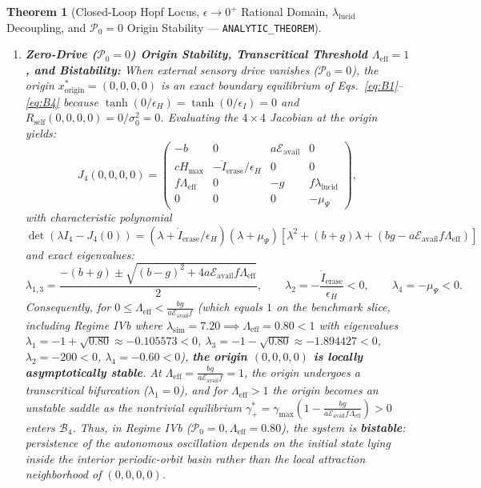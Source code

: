 \documentclass[11pt,a4paper]{article}
\newtheorem{theorem}{Theorem}
\theoremstyle{definition}
\begin{document}
\begin{theorem}[Closed-Loop Hopf Locus, $\epsilon \to 0^+$ Rational Domain, $\lambda_{\mathrm{lucid}}$ Decoupling, and $\mathcal{P}_0 = 0$ Origin Stability --- \texttt{ANALYTIC\_THEOREM}]
\begin{enumerate}
  \item \textbf{Zero-Drive ($\mathcal{P}_0 = 0$) Origin Stability, Transcritical Threshold $\Lambda_{\mathrm{eff}} = 1$, and Bistability:} When external sensory drive vanishes ($\mathcal{P}_0 = 0$), the origin $x_{\mathrm{origin}}^* = (0, 0, 0, 0)$ is an exact boundary equilibrium of Eqs.~\eqref{eq:B1}--\eqref{eq:B4} because $\tanh(0/\epsilon_H) = \tanh(0/\epsilon_I) = 0$ and $R_{\mathrm{self}}(0,0,0,0) = 0/\sigma_0^2 = 0$. Evaluating the $4\times 4$ Jacobian at the origin yields:
  \begin{equation}
  \label{eq:J4_origin}
  J_4(0,0,0,0) =
  \begin{pmatrix}
    -b & 0 & a\mathcal{E}_{\mathrm{avail}} & 0 \\
    c H_{\max} & -\dot{I}_{\mathrm{erase}}/\epsilon_H & 0 & 0 \\
    f\Lambda_{\mathrm{eff}} & 0 & -g & f\lambda_{\mathrm{lucid}} \\
    0 & 0 & 0 & -\mu_\Psi
  \end{pmatrix},
  \end{equation}
  with characteristic polynomial $\det(\lambda I_4 - J_4(0)) = (\lambda + \dot{I}_{\mathrm{erase}}/\epsilon_H)(\lambda + \mu_\Psi)\left[\lambda^2 + (b+g)\lambda + (bg - a\mathcal{E}_{\mathrm{avail}}f\Lambda_{\mathrm{eff}})\right]$ and exact eigenvalues:
  \begin{equation}
  \label{eq:origin_eigs}
  \lambda_{1,3} = \frac{-(b+g) \pm \sqrt{(b-g)^2 + 4a\mathcal{E}_{\mathrm{avail}}f\Lambda_{\mathrm{eff}}}}{2}, \qquad \lambda_2 = -\frac{\dot{I}_{\mathrm{erase}}}{\epsilon_H} < 0, \qquad \lambda_4 = -\mu_\Psi < 0.
  \end{equation}
  Consequently, for $0 \le \Lambda_{\mathrm{eff}} < \frac{bg}{a\mathcal{E}_{\mathrm{avail}}f}$ (which equals $1$ on the benchmark slice, including Regime IVb where $\lambda_{\mathrm{sim}} = 7.20 \implies \Lambda_{\mathrm{eff}} = 0.80 < 1$ with eigenvalues $\lambda_1 = -1 + \sqrt{0.80} \approx -0.105573 < 0$, $\lambda_3 = -1 - \sqrt{0.80} \approx -1.894427 < 0$, $\lambda_2 = -200 < 0$, $\lambda_4 = -0.60 < 0$), \textbf{the origin $(0,0,0,0)$ is locally asymptotically stable}. At $\Lambda_{\mathrm{eff}} = \frac{bg}{a\mathcal{E}_{\mathrm{avail}}f} = 1$, the origin undergoes a transcritical bifurcation ($\lambda_1 = 0$), and for $\Lambda_{\mathrm{eff}} > 1$ the origin becomes an unstable saddle as the nontrivial equilibrium $\gamma_+^* = \gamma_{\max}\!\left(1 - \frac{bg}{a\mathcal{E}_{\mathrm{avail}}f\Lambda_{\mathrm{eff}}}\right) > 0$ enters $\mathcal{B}_4$. Thus, in Regime IVb ($\mathcal{P}_0 = 0, \Lambda_{\mathrm{eff}} = 0.80$), the system is \textbf{bistable}: persistence of the autonomous oscillation depends on the initial state lying inside the interior periodic-orbit basin rather than the local attraction neighborhood of $(0,0,0,0)$.
\end{enumerate}
\end{theorem}
\end{document}
